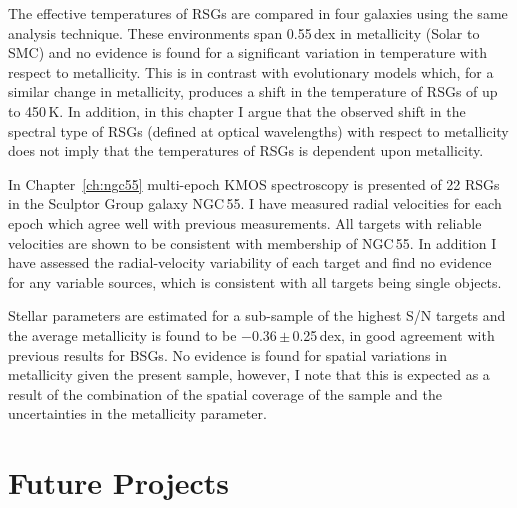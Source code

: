 The effective temperatures of RSGs are compared in four galaxies using the same analysis technique.
These environments span 0.55\,dex in metallicity (Solar to SMC) and no evidence is found for a significant variation in temperature with respect to metallicity.
This is in contrast with evolutionary models which, for a  similar change in metallicity, produces a shift in the temperature of RSGs of up to 450\,K.
In addition, in this chapter I argue that the observed shift in the spectral type of RSGs (defined at optical wavelengths) with respect to metallicity does not imply that the temperatures of RSGs is dependent upon metallicity.


In Chapter~\ref{ch:ngc55} multi-epoch KMOS spectroscopy is presented of 22 RSGs in the Sculptor Group galaxy NGC\,55.
I have measured radial velocities for each epoch which agree well with previous measurements.
All targets with reliable velocities are shown to be consistent with membership of NGC\,55.
In addition I have assessed the radial-velocity variability of each target and find no evidence for any variable sources, which is consistent with all targets being single objects.

Stellar parameters are estimated for a sub-sample of the highest S/N targets and the average metallicity is found to be $-$0.36\,$\pm$\,0.25\,dex, in good agreement with previous results for BSGs.
No evidence is found for spatial variations in metallicity given the present sample, however, I note that this is expected as a result of the combination of the spatial coverage of the sample and the uncertainties in the metallicity parameter.


\section{Future Projects} %
\label{sec:future_projects}


